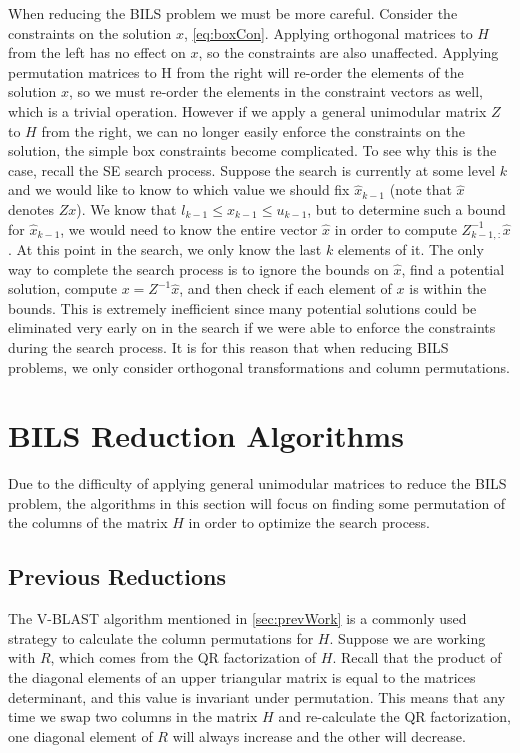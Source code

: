 \documentclass[12pt,Bold,letterpaper]{mcgilletdclass}
\newcommand{\vsp}{\vspace{\baselineskip}}
\begin{document}
When reducing the BILS problem we must be more careful. Consider the constraints on the solution $x$, \eqref{eq:boxCon}. Applying orthogonal matrices to $H$ from the left has no effect on $x$, so the constraints are also unaffected. Applying permutation matrices to H from the right will re-order the elements of the solution $x$, so we must re-order the elements in the constraint vectors as well, which is a trivial operation. However if we apply a general unimodular matrix $Z$ to $H$ from the right, we can no longer easily enforce the constraints on the solution, the simple box constraints become complicated. To see why this is the case, recall the SE search process. Suppose the search is currently at some level $k$ and we would like to know to which value we should fix $\hat{x}_{k-1}$ (note that $\hat{x}$ denotes $Zx$). We know that $l_{k-1} \le x_{k-1} \le u_{k-1}$, but to determine such a bound for $\hat{x}_{k-1}$, we would need to know the entire vector $\hat{x}$ in order to compute $Z^{-1}_{k-1,:}\hat{x}$. At this point in the search, we only know the last $k$ elements of it. The only way to complete the search process is to ignore the bounds on $\hat{x}$, find a potential solution, compute $x = Z^{-1}\hat{x}$, and then check if each element of $x$ is within the bounds. This is extremely inefficient since many potential solutions could be eliminated very early on in the search if we were able to enforce the constraints during the search process. It is for this reason that when reducing BILS problems, we only consider orthogonal transformations and column permutations.

\vsp \section{BILS Reduction Algorithms} \label{sec:BILSReduction}

Due to the difficulty of applying general unimodular matrices to reduce the BILS problem, the algorithms in this section will focus on finding some permutation of the columns of the matrix $H$ in order to optimize the search process.

\vsp \subsection{Previous Reductions}
The V-BLAST algorithm \cite{FosGVW99} mentioned in \ref{sec:prevWork} is a commonly used strategy to calculate the column permutations for $H$. Suppose we are working with $R$, which comes from the QR factorization of $H$. Recall that the product of the diagonal elements of an upper triangular matrix is equal to the matrices determinant, and this value is invariant under permutation. This means that any time we swap two columns in the matrix $H$ and re-calculate the QR factorization, one diagonal element of $R$ will always increase and the other will decrease.
\end{document}
